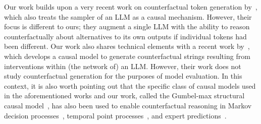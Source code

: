 %
%
%
Our work builds upon a very recent work on counterfactual token generation by~\citet{chatzi2024counterfactual}, which also treats the sampler of an LLM as a causal mechanism.
%
However, their focus is different to ours; they augment a single LLM with the ability to reason counterfactually about alternatives to its own outputs if individual tokens had been different.
% 
Our work also shares technical elements with a recent work by~\citet{ravfogel2024counterfactual}, which develops a causal model to generate counterfactual strings resulting from interventions within (the network of) an LLM. 
However, their work does not study counterfactual generation for the purposes of model evaluation.
% 
In this context, it is also worth pointing out that the specific class of causal models used in the aforementioned works and our work, called the Gumbel-max structural causal model~\cite{oberst2019counterfactual}, has also been used to enable counterfactual reasoning in Markov decision processes~\citep{tsirtsis2021counterfactual}, temporal point processes~\citep{noorbakhsh2022counterfactual}, and expert predictions~\citep{benz2022counterfactual}.

